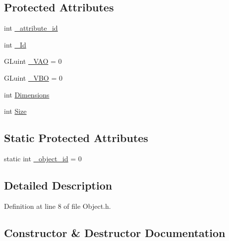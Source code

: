 \subsection*{Protected Attributes}
\begin{DoxyCompactItemize}
\item 
int \mbox{\hyperlink{classEngine_1_1Components_1_1Objects_1_1VertexObject_a401aa1eb0254e57d8295c2287749eed5}{\+\_\+attribute\+\_\+id}}
\item 
int \mbox{\hyperlink{classEngine_1_1Components_1_1Objects_1_1VertexObject_aa76ac755e9e37853a778795f0a0ad15e}{\+\_\+\+Id}}
\item 
G\+Luint \mbox{\hyperlink{classEngine_1_1Components_1_1Objects_1_1VertexObject_ae85ac9d5ded8f54d58feb7fb78e75130}{\+\_\+\+V\+AO}} = 0
\item 
G\+Luint \mbox{\hyperlink{classEngine_1_1Components_1_1Objects_1_1VertexObject_a79e171ffe4b9342d76c0c729a9836fd2}{\+\_\+\+V\+BO}} = 0
\item 
int \mbox{\hyperlink{classEngine_1_1Components_1_1Objects_1_1VertexObject_ae5bb104a878dc8a3c909ec9b0ee799c1}{Dimensions}}
\item 
int \mbox{\hyperlink{classEngine_1_1Components_1_1Objects_1_1VertexObject_a13ec6e4a92520bdd1b33ad6de757cb92}{Size}}
\end{DoxyCompactItemize}
\subsection*{Static Protected Attributes}
\begin{DoxyCompactItemize}
\item 
static int \mbox{\hyperlink{classEngine_1_1Components_1_1Objects_1_1VertexObject_aef076731df98a4806c644a3ac4400ae2}{\+\_\+object\+\_\+id}} = 0
\end{DoxyCompactItemize}


\subsection{Detailed Description}


Definition at line 8 of file Object.\+h.



\subsection{Constructor \& Destructor Documentation}
\mbox{\label{classEngine_1_1Objects_1_1Object_a4798ee926dcbd761e7e88fdeb73f2f0a}} 
